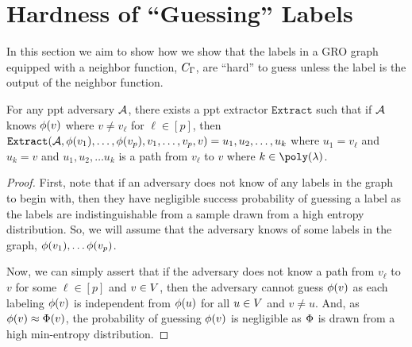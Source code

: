 




\section{Hardness of ``Guessing'' Labels}
In this section we aim to show how we show that the labels in a GRO graph equipped with a neighbor function, $C_\Gamma$,
are ``hard'' to guess unless the label is the output of the neighbor function.


\newcommand{\extract}{\texttt{Extract}}
\begin{claim}
	For any ppt adversary $\mathcal{A}$, there exists a ppt extractor $\extract$ such that if $\mathcal{A}$ knows $\phi(v)$ where $v \neq v_\ell$ for $\ell \in [p]$, then
	$\extract(\advers, \embedFn(v_1), \dots, \embedFn(v_p), v_1, \dots, v_p, v) = u_1, u_2, \dots, u_k$ where $u_1 = v_\ell$ and $u_k = v$  and $u_1, u_2, \dots u_k$ is a path from $v_\ell$ to $v$ where $k \in \poly(\lambda)$.
\end{claim}
\begin{proof}

First, note that if an adversary does not know of any labels in the graph to begin with, then
they have negligible success probability of guessing a label as the labels are indistinguishable from a sample drawn from a high entropy distribution.
So, we will assume that the adversary knows of some labels in the graph, $\phi(v_1), \dots \phi(v_p)$.

Now, we can simply assert that if the adversary does not know a path from $v_\ell$ to $v$ for some $\ell \in [p]$ and $v \in V$, then
the adversary cannot guess $\phi(v)$ as each labeling $\phi(v)$ is independent from $\phi(u)$ for all $u \in V$ and $v \neq u$. And, as $\phi(v) \approx \Phi(v)$,
the probability of guessing $\phi(v)$ is negligible as $\Phi$ is drawn from a high min-entropy distribution.

\end{proof}

